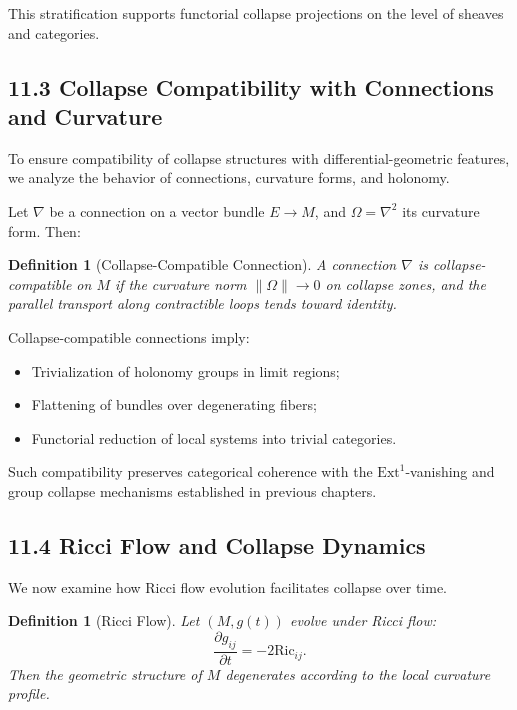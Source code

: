 \documentclass[11pt]{article}
\newtheorem{definition}[theorem]{Definition}
\begin{document}
This stratification supports functorial collapse projections on the level of sheaves and categories.

\subsection*{11.3 Collapse Compatibility with Connections and Curvature}

To ensure compatibility of collapse structures with differential-geometric features, we analyze the behavior of connections, curvature forms, and holonomy.

Let \( \nabla \) be a connection on a vector bundle \( E \to M \), and \( \Omega = \nabla^2 \) its curvature form. Then:

\begin{definition}[Collapse-Compatible Connection]
A connection \( \nabla \) is \emph{collapse-compatible} on \( M \) if the curvature norm \( \| \Omega \| \to 0 \) on collapse zones, and the parallel transport along contractible loops tends toward identity.
\end{definition}

Collapse-compatible connections imply:
\begin{itemize}
    \item Trivialization of holonomy groups in limit regions;
    \item Flattening of bundles over degenerating fibers;
    \item Functorial reduction of local systems into trivial categories.
\end{itemize}

Such compatibility preserves categorical coherence with the \(\mathrm{Ext}^1\)-vanishing and group collapse mechanisms established in previous chapters.

\subsection*{11.4 Ricci Flow and Collapse Dynamics}

We now examine how Ricci flow evolution facilitates collapse over time.

\begin{definition}[Ricci Flow]
Let \( (M, g(t)) \) evolve under Ricci flow:
\[
\frac{\partial g_{ij}}{\partial t} = -2 \mathrm{Ric}_{ij}.
\]
Then the geometric structure of \( M \) degenerates according to the local curvature profile.
\end{definition}
\end{document}
